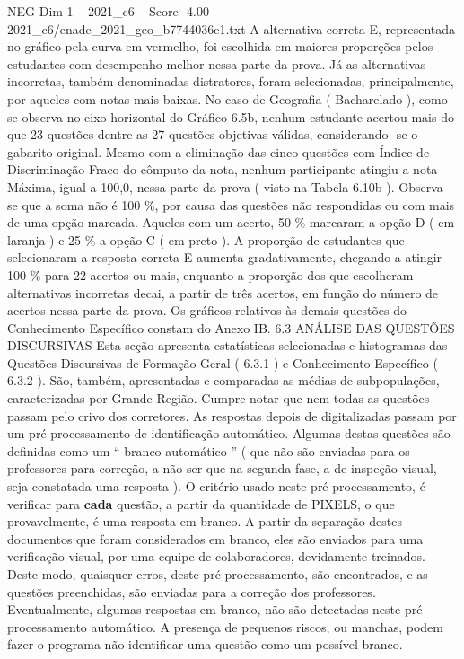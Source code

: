 \begin{textsample}{NEG Dim 1 – 2021\_c6 – Score -4.00 – 2021\_c6/enade\_2021\_geo\_b7744036e1.txt}
A alternativa correta E, representada no gráfico pela curva em vermelho, foi escolhida em maiores proporções pelos estudantes com desempenho melhor nessa parte da prova.
Já as alternativas incorretas, também denominadas distratores, foram selecionadas, principalmente, por aqueles com notas mais baixas.
No caso de Geografia ( Bacharelado ), como se observa no eixo horizontal do Gráfico 6.5b, nenhum estudante acertou mais do que 23 questões dentre as 27 questões objetivas válidas, considerando -se o gabarito original.
Mesmo com a eliminação das cinco questões com Índice de Discriminação Fraco do cômputo da nota, nenhum participante atingiu a nota Máxima, igual a 100,0, nessa parte da prova ( visto na Tabela 6.10b ).
Observa -se que a soma não é 100 \%, por causa das questões não respondidas ou com mais de uma opção marcada.
Aqueles com um acerto, 50 \% marcaram a opção D ( em laranja ) e 25 \% a opção C ( em preto ).
A proporção de estudantes que selecionaram a resposta correta E aumenta gradativamente, chegando a atingir 100 \% para 22 acertos ou mais, enquanto a proporção dos que escolheram alternativas incorretas decai, a partir de três acertos, em função do número de acertos nessa parte da prova.
Os gráficos relativos às demais questões do Conhecimento Específico constam do Anexo IB. 6.3 ANÁLISE DAS QUESTÕES DISCURSIVAS Esta seção apresenta estatísticas selecionadas e histogramas das Questões Discursivas de Formação Geral ( 6.3.1 ) e Conhecimento Específico ( 6.3.2 ).
São, também, apresentadas e comparadas as médias de subpopulações, caracterizadas por Grande Região.
Cumpre notar que nem todas as questões passam pelo crivo dos corretores.
As respostas depois de digitalizadas passam por um pré-processamento de identificação automático.
Algumas destas questões são definidas como um “ branco automático ” ( que não são enviadas para os professores para correção, a não ser que na segunda fase, a de inspeção visual, seja constatada uma resposta ).
O critério usado neste pré-processamento, é verificar para \textbf{cada} questão, a partir da quantidade de PIXELS, o que provavelmente, é uma resposta em branco.
A partir da separação destes documentos que foram considerados em branco, eles são enviados para uma verificação visual, por uma equipe de colaboradores, devidamente treinados.
Deste modo, quaisquer erros, deste pré-processamento, são encontrados, e as questões preenchidas, são enviadas para a correção dos professores.
Eventualmente, algumas respostas em branco, não são detectadas neste pré-processamento automático.
A presença de pequenos riscos, ou manchas, podem fazer o programa não identificar uma questão como um possível branco.

\end{textsample}
